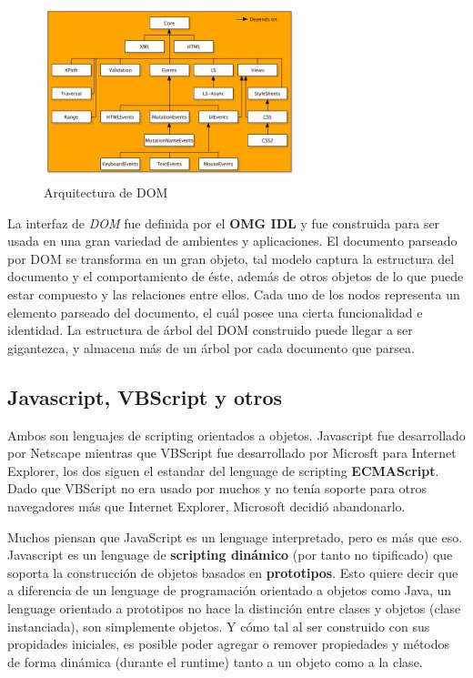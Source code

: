     \begin{figure}[h]
        \centering
        \includegraphics[width=0.65\textwidth]{figures/dom-architecture.jpg}
        \caption{Arquitectura de DOM \cite{w3c}}
        \label{fig:DOM}
    \end{figure}
            
    La interfaz de \textit{DOM} fue definida por el \textbf{OMG IDL} y fue construida para ser usada en una gran variedad de ambientes y aplicaciones. El documento parseado por DOM se transforma en un gran objeto, tal modelo captura la estructura del documento y el comportamiento de éste, además de otros objetos de lo que puede estar compuesto y las relaciones entre ellos. Cada uno de los nodos representa un elemento parseado del documento, el cuál posee una cierta funcionalidad e identidad. La estructura de árbol del DOM construido puede llegar a ser gigantezca, y almacena más de un árbol por cada documento que parsea. 
            
    \subsection{Javascript, VBScript y otros}
    \label{chap2:JS}
    Ambos son lenguajes de scripting orientados a objetos. Javascript fue desarrollado por Netscape mientras que VBScript fue desarrollado por Microsft para Internet Explorer, los dos siguen el estandar del lenguage de scripting \textbf{ECMAScript}. Dado que VBScript no era usado por muchos y no tenía soporte para otros navegadores más que Internet Explorer, Microsoft decidió abandonarlo.

    Muchos piensan que JavaScript es un lenguage interpretado, pero es más que eso. Javascript es un lenguage de \textbf{scripting dinámico} (por tanto no tipificado) que soporta la construcción de objetos basados en \textbf{prototipos}. Esto quiere decir que a diferencia de un lenguage de programación orientado a objetos como Java, un lenguage orientado a prototipos no hace la distinción entre clases y objetos (clase instanciada), son simplemente objetos. Y cómo tal al ser construido con sus propidades iniciales, es posible poder agregar o remover propiedades y métodos de forma dinámica (durante el runtime) tanto a un objeto como a la clase.
            
